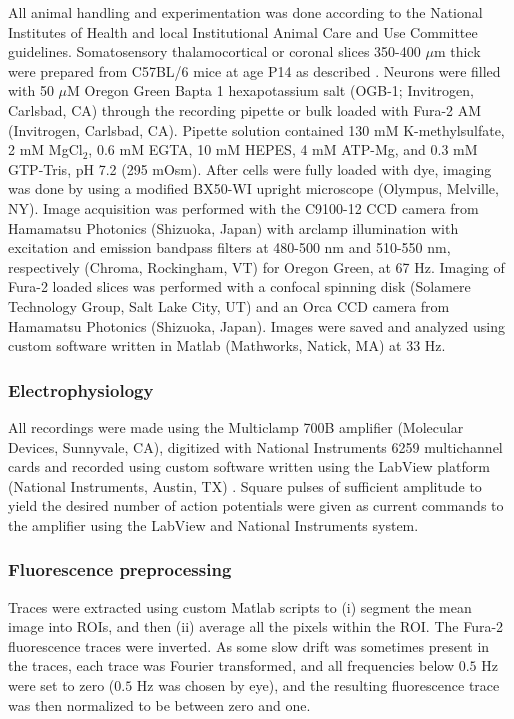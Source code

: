 All animal handling and experimentation was done according to the National Institutes of Health and local Institutional Animal Care and Use Committee guidelines. Somatosensory thalamocortical or coronal slices 350-400 $\mu$m thick were prepared from C57BL/6 mice at age P14 as described \cite{MacLeanYuste05}. Neurons were filled with 50 $\mu$M Oregon Green Bapta 1 hexapotassium salt (OGB-1; Invitrogen, Carlsbad, CA) through the recording pipette or bulk loaded with Fura-2 AM (Invitrogen, Carlsbad, CA). Pipette solution contained 130 mM K-methylsulfate, 2 mM MgCl$_2$, $0.6$ mM EGTA, 10 mM HEPES, 4 mM ATP-Mg, and $0.3$ mM GTP-Tris, pH 7.2 (295 mOsm).  After cells were fully loaded with dye, imaging was done by using a modified BX50-WI upright microscope (Olympus, Melville, NY).  Image acquisition was performed with the C9100-12 CCD camera from Hamamatsu Photonics (Shizuoka, Japan) with arclamp illumination with excitation and emission bandpass filters at 480-500 nm and 510-550 nm, respectively  (Chroma, Rockingham, VT) for Oregon Green, at 67 Hz. Imaging of Fura-2 loaded slices was performed with a confocal spinning disk (Solamere Technology Group, Salt Lake City, UT) and an Orca CCD camera from Hamamatsu Photonics (Shizuoka, Japan). Images were saved and analyzed using custom software written in Matlab (Mathworks, Natick, MA) at 33 Hz.

\subsubsection{Electrophysiology}

All recordings were made using the Multiclamp 700B amplifier (Molecular Devices, Sunnyvale, CA), digitized with National Instruments 6259 multichannel cards and recorded using custom software written using the LabView platform (National Instruments, Austin, TX) .  Square pulses of sufficient amplitude to yield the desired number of action potentials were given as current commands to the amplifier using the LabView and National Instruments system.

\subsubsection{Fluorescence preprocessing}

Traces were extracted using custom Matlab scripts to (i) segment the mean image into ROIs, and then (ii) average all the pixels within the ROI.  The Fura-2 fluorescence traces were inverted.  As some slow drift was sometimes present in the traces, each trace was Fourier transformed, and all frequencies below $0.5$ Hz were set to zero ($0.5$ Hz was chosen by eye), and the resulting fluorescence trace was then normalized to be between zero and one.  







